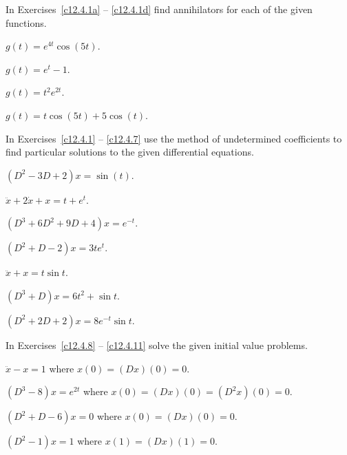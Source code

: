 \documentclass{ximera}
\begin{document}
\EXER

\TEXER

\noindent In Exercises~\ref{c12.4.1a} -- \ref{c12.4.1d} find annihilators 
for each of the given functions.
\begin{exercise}  \label{c12.4.1a}
$g(t) = e^{4t}\cos(5t)$.
\end{exercise}
\begin{exercise}  \label{c12.4.1b}
$g(t) = e^t-1$.
\end{exercise}
\begin{exercise}  \label{c12.4.1c}
$g(t) = t^2e^{2t}$.
\end{exercise}
\begin{exercise}  \label{c12.4.1d}
$g(t) = t\cos(5t)+5\cos(t)$.
\end{exercise}

\noindent In Exercises~\ref{c12.4.1} -- \ref{c12.4.7} use the method of 
undetermined coefficients to find particular solutions to the given 
differential equations.
\begin{exercise}  \label{c12.4.1}
$(D^2-3D+2)x = \sin(t)$.
\end{exercise}
\begin{exercise}  \label{c12.4.2}
$\ddot{x}+2\dot{x}+x = t + e^t$.
\end{exercise}
\begin{exercise}  \label{c12.4.3}
$(D^3+6D^2+9D+4)x = e^{-t}$.
\end{exercise}
\begin{exercise}  \label{c12.4.4}
$(D^2+D-2)x = 3te^t$.
\end{exercise}
\begin{exercise}  \label{c12.4.5}
$\ddot{x}+x = t\sin t$.
\end{exercise}
\begin{exercise}  \label{c12.4.6}
$(D^3+D)x = 6t^2+\sin t$.
\end{exercise}
\begin{exercise}  \label{c12.4.7}
$(D^2+2D+2)x = 8e^{-t}\sin t$.
\end{exercise}

\noindent In Exercises~\ref{c12.4.8}  -- \ref{c12.4.11} solve the given 
initial value problems.
\begin{exercise}  \label{c12.4.8}
$\ddot{x}-x = 1$ where $x(0)=(Dx)(0)=0$.
\end{exercise}
\begin{exercise}  \label{c12.4.9}
$(D^3-8)x = e^{2t}$ where $x(0)=(Dx)(0)=(D^2x)(0)=0$.
\end{exercise}
\begin{exercise}  \label{c12.4.10}
$(D^2+D-6)x = 0$ where $x(0)=(Dx)(0)=0$.
\end{exercise}
\begin{exercise}  \label{c12.4.11}
$(D^2-1)x = 1$ where $x(1)=(Dx)(1)=0$.
\end{exercise}
\end{document}
